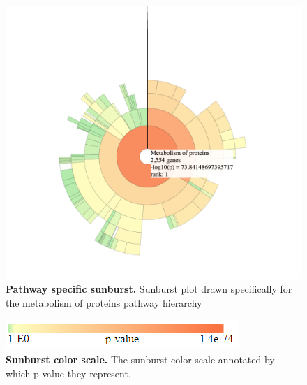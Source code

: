 \documentclass[11pt]{article}
\begin{document}
\begin{figure}[htp]
\begin{center}
\includegraphics[width=0.96\linewidth,clip]{./img/mop_specific.png}
\caption{\label{fig:mop_specific} {\bf Pathway specific sunburst.} Sunburst plot drawn specifically for the metabolism of proteins pathway hierarchy}
\end{center}
\end{figure}

\begin{figure}[htp]
\begin{center}
\includegraphics[width=0.96\linewidth,clip]{./img/color_scale.png}
\caption{\label{fig:color_scale} {\bf Sunburst color scale.} The sunburst color scale annotated by which p-value they represent.}
\end{center}
\end{figure}
\end{document}
